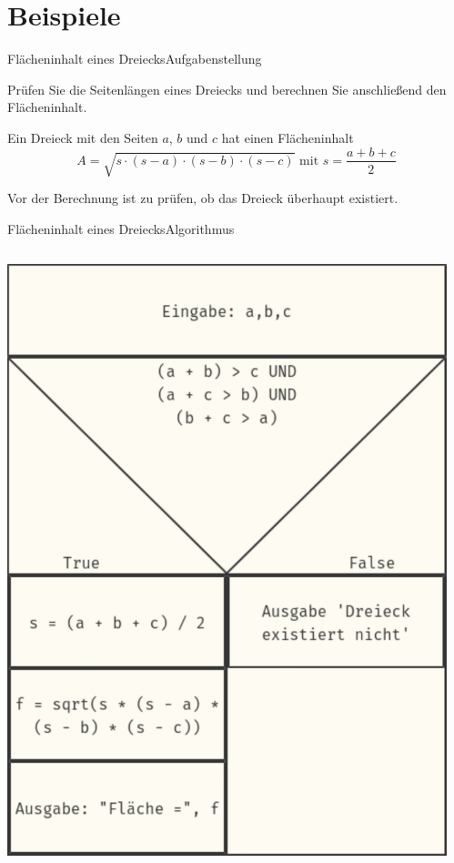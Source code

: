 \documentclass[xelatex,aspectratio=169]{beamer}
\begin{document}
\section{Beispiele}

\begin{frame}{Flächeninhalt eines Dreiecks}{Aufgabenstellung}

  Prüfen Sie die Seitenlängen eines Dreiecks und berechnen Sie anschließend den Flächeninhalt.

  Ein Dreieck mit den Seiten $a$, $b$ und $c$ hat einen Flächeninhalt
  \[
    A = \sqrt{s \cdot (s - a) \cdot (s - b) \cdot (s - c)} \mbox{ mit } s = \frac{a + b + c}{2}
  \]

  Vor der Berechnung ist zu prüfen, ob das Dreieck überhaupt existiert.
\end{frame}

\begin{frame}{Flächeninhalt eines Dreiecks}{Algorithmus}
  \begin{columns}
    \begin{column}{.32\textwidth}
      \includegraphics[height=.8\textheight]{fig/algorithmus_dreiecksflaeche.pdf}
    \end{column}
    \begin{column}{.68\textwidth}
      \small
    \end{column}
  \end{columns}
\end{frame}
\end{document}
